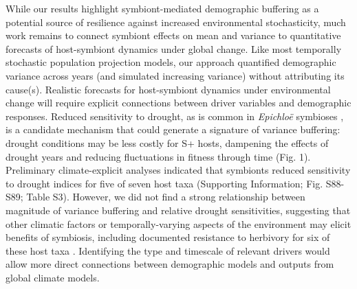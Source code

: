 \documentclass[lineno, sn-basic]{sn-jnl}%
\begin{document}
While our results highlight symbiont-mediated demographic buffering as a potential source of resilience against increased environmental stochasticity, much work remains to connect symbiont effects on mean and variance to quantitative forecasts of host-symbiont dynamics under global change. 
Like most temporally stochastic population projection models, our approach quantified demographic variance across years (and simulated increasing variance) without attributing its cause(s). 
Realistic forecasts for host-symbiont dynamics under environmental change will require explicit connections between driver variables and demographic responses. 
Reduced sensitivity to drought, as is common in \emph{Epichlo\"{e}} symbioses \citep{reyna2012detection,saikkonen2013chemical,neyaz2022localization,decunta2021systematic}, is a candidate mechanism that could generate a signature of variance buffering: drought conditions may be less costly for S+ hosts, dampening the effects of drought years and reducing fluctuations in fitness through time (Fig. 1).
Preliminary climate-explicit analyses indicated that symbionts reduced sensitivity to drought indices for five of seven host taxa (Supporting Information; Fig. S88-S89; Table S3).
However, we did not find a strong relationship between magnitude of variance buffering and relative drought sensitivities, suggesting that other climatic factors or temporally-varying aspects of the environment may elicit benefits of symbiosis, including documented resistance to herbivory for six of these host taxa \citep{rudgers2008invasive,crawford2010fungal}.
Identifying the type and timescale of relevant drivers would allow more direct connections between demographic models and outputs from global climate models.
\end{document}
